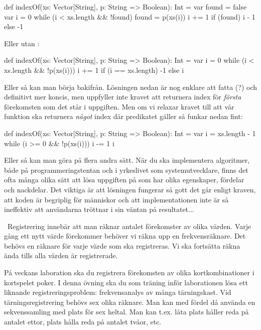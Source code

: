 \begin{Code}
def indexOf(xs: Vector[String], p: String => Boolean): Int = {
  var found = false
  var i = 0
  while (i < xs.length && !found) {
      found = p(xs(i))
      i += 1
  }
  if (found) i - 1 else -1
}
\end{Code}
Eller utan :
\begin{Code}
def indexOf(xs: Vector[String], p: String => Boolean): Int = {
  var i = 0
  while (i < xs.length && !p(xs(i))) i += 1
  if (i == xs.length) -1 else i
}
\end{Code}
Eller så kan man börja bakifrån. Lösningen nedan är nog enklare att fatta (?) och definitivt mer koncis, men uppfyller inte kravet att returnera index för \emph{första} förekomsten som det står i uppgiften. Men om vi relaxar kravet till att vår funktion ska returnera \emph{något} index där predikatet gäller så funkar nedan fint:
\begin{Code}
def indexOf(xs: Vector[String], p: String => Boolean): Int = {
  var i = xs.length - 1
  while (i >= 0 && !p(xs(i))) i -= 1
  i
}
\end{Code}
Eller så kan man göra på flera andra sätt. När du ska implementera algoritmer, både på programmeringstentan och i yrkeslivet som systemutvecklare, finns det ofta många olika sätt att lösa uppgiften på som har olika egenskaper, fördelar och nackdelar. Det viktiga är att lösningen fungerar så gott det går enligt kraven, att koden är begriplig för människor och att implementationen inte är så ineffektiv att användarna tröttnar i sin väntan på resultatet...

\QUESTEND





\QUESTBEGIN

\Task \what~Registrering innebär att man räknar antalet förekomster av olika värden. Varje gång ett nytt värde förekommer behöver vi räkna upp en frekvensräknare. Det behövs en räknare för varje värde som ska registreras. Vi ska fortsätta räkna ända tills alla värden är registrerade.

På veckans laboration ska du registrera förekomsten av olika kortkombinationer i kortspelet poker. I denna övning ska du som träning inför laborationen lösa ett liknande registreringsproblem:  frekvensanalys av många tärningskast. Vid tärningsregistrering behövs sex olika räknare. Man kan med fördel då använda en sekvenssamling med plats för sex heltal. Man kan t.ex. låta  plats  håller reda på antalet ettor, plats  hålla reda på antalet tvåor, etc.

